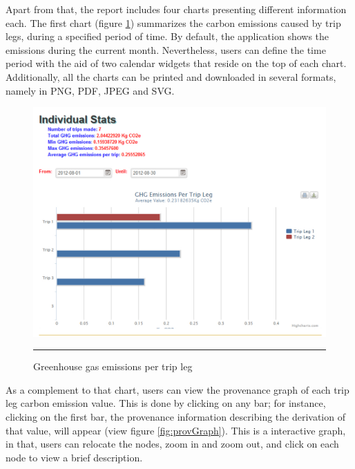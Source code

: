 Apart from that, the report includes four charts presenting different information each. The first chart (figure \ref{fig:ghgPerTripLeg}) summarizes the carbon emissions caused by trip legs, during a specified period of time. By default, the application shows the emissions during the current month. Nevertheless, users can define the time period with the aid of two calendar widgets that reside on the top of each chart. Additionally, all the charts can be printed and downloaded in several formats, namely in PNG, PDF, JPEG and SVG.

\begin{figure}[htbp]
	\centering
		\includegraphics[scale=0.60]{./Figures/chapter4/figure17.pdf}
		\rule{35em}{0.5pt}
	\caption[Greenhouse gas emissions per trip leg]{Greenhouse gas emissions per trip leg}
	\label{fig:ghgPerTripLeg}
\end{figure}

As a complement to that chart, users can view the provenance graph of each trip leg carbon emission value. This is done by clicking on any bar; for instance, clicking on the first bar, the provenance information describing the derivation of that value, will appear (view figure \ref{fig:provGraph}). This is a interactive graph, in that, users can relocate the nodes, zoom in and zoom out, and click on each node to view a brief description.

